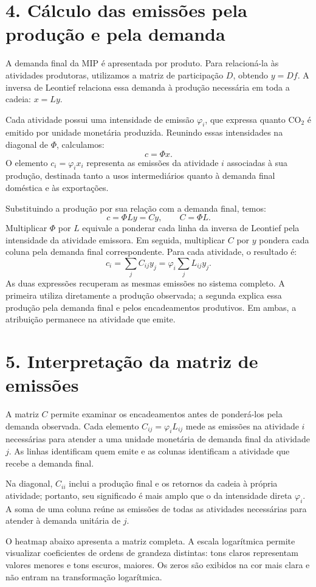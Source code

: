 \documentclass[12pt]{article}
\begin{document}
\newpage
\section*{4. Cálculo das emissões pela produção e pela demanda}
A demanda final da MIP é apresentada por produto. Para relacioná-la às atividades produtoras, utilizamos a matriz de participação $D$, obtendo $y=Df$. A inversa de Leontief relaciona essa demanda à produção necessária em toda a cadeia: $x=Ly$.

Cada atividade possui uma intensidade de emissão $\varphi_i$, que expressa quanto CO$_2$ é emitido por unidade monetária produzida. Reunindo essas intensidades na diagonal de $\Phi$, calculamos:
\[
c=\Phi x.
\]
O elemento $c_i=\varphi_i x_i$ representa as emissões da atividade $i$ associadas à sua produção, destinada tanto a usos intermediários quanto à demanda final doméstica e às exportações.

Substituindo a produção por sua relação com a demanda final, temos:
\[
c=\Phi Ly=Cy,\qquad C=\Phi L.
\]
Multiplicar $\Phi$ por $L$  equivale a ponderar cada linha da inversa de Leontief pela intensidade da atividade emissora. Em seguida, multiplicar $C$ por $y$ pondera cada coluna pela demanda final correspondente. Para cada atividade, o resultado é:
\[
c_i=\sum_j C_{ij}y_j=\varphi_i\sum_jL_{ij}y_j.
\]
As duas expressões recuperam as mesmas emissões no sistema completo. A primeira utiliza diretamente a produção observada; a segunda explica essa produção pela demanda final e pelos encadeamentos produtivos. Em ambas, a atribuição permanece na atividade que emite.

\section*{5. Interpretação da matriz de emissões}
A matriz $C$ permite examinar os encadeamentos antes de ponderá-los pela demanda observada. Cada elemento $C_{ij}=\varphi_iL_{ij}$ mede as emissões na atividade $i$ necessárias para atender a uma unidade monetária de demanda final da atividade $j$. As linhas identificam quem emite e as colunas identificam a atividade que recebe a demanda final.

Na diagonal, $C_{ii}$ inclui a produção final e os retornos da cadeia à própria atividade; portanto, seu significado é mais amplo que o da intensidade direta $\varphi_i$. A soma de uma coluna reúne as emissões de todas as atividades necessárias para atender à demanda unitária de $j$.

O heatmap abaixo apresenta a matriz completa. A escala logarítmica permite visualizar coeficientes de ordens de grandeza distintas: tons claros representam valores menores e tons escuros, maiores. Os zeros são exibidos na cor mais clara e não entram na transformação logarítmica.
\end{document}
